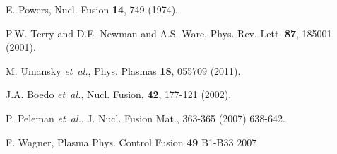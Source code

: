 \documentclass[aps,prl,amsmath,amssymb,preprint,superscriptaddress]{revtex4} %
\begin{document}
\begin{thebibliography}{10}
E. Powers, Nucl. Fusion {\bf 14},  749  (1974).

P.W. Terry and D.E. Newman and A.S. Ware, Phys. Rev. Lett. {\bf 87}, 185001  (2001).

M. Umansky {\it et~al.}, Phys. Plasmas {\bf 18},  055709  (2011).

J.A. Boedo {\it et~al.}, Nucl. Fusion, {\bf 42}, 177-121 (2002).

P. Peleman {\it et~al.}, J. Nucl. Fusion Mat., 363-365 (2007) 638-642.

F. Wagner, Plasma Phys. Control Fusion {\bf 49} B1-B33 {2007}

\end{thebibliography}
\end{document}
